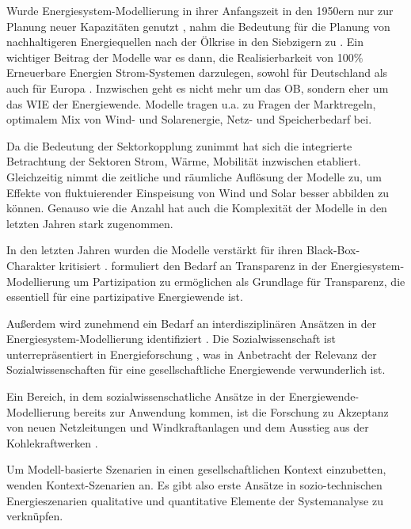 \documentclass[a4paper,11pt,twoside]{scrartcl}
\begin{document}
Wurde Energiesystem-Modellierung in ihrer Anfangszeit in den 1950ern nur zur Planung neuer Kapazitäten genutzt \cite{Kagiannas2004}, nahm die Bedeutung für die Planung von nachhaltigeren Energiequellen nach der Ölkrise in den Siebzigern zu \cite{Wei2006}. Ein wichtiger Beitrag der Modelle war es dann, die Realisierbarkeit von 100\% Erneuerbare Energien Strom-Systemen darzulegen, sowohl für Deutschland \cite{SRU2011} als auch für Europa \cite{Hohmeyer2015}. Inzwischen geht es nicht mehr um das OB, sondern eher um das WIE der Energiewende. Modelle tragen u.a. zu Fragen der Marktregeln, optimalem Mix von Wind- und Solarenergie, Netz- und Speicherbedarf bei.  

Da die Bedeutung der Sektorkopplung zunimmt \cite{Quaschning2016} hat sich die integrierte Betrachtung der Sektoren Strom, Wärme, Mobilität inzwischen etabliert. Gleichzeitig nimmt die zeitliche und räumliche Auflösung der Modelle zu, um Effekte von fluktuierender Einspeisung von Wind und Solar besser abbilden zu können. Genauso wie die Anzahl hat auch die Komplexität der Modelle in den letzten Jahren stark zugenommen.

In den letzten Jahren wurden die Modelle verstärkt für ihren Black-Box-Charakter kritisiert \cite{Pfenninger2017, Pfenninger2017b,Cao2016}. \cite{Wiese2015} formuliert den Bedarf an Transparenz in der Energiesystem-Modellierung um Partizipation zu ermöglichen \cite{Wiese2014} als Grundlage für Transparenz, die essentiell für eine partizipative Energiewende ist.

Außerdem wird zunehmend ein Bedarf an interdisziplinären Ansätzen in der Energiesystem-Modellierung identifiziert \cite{Wiese2018,Pfenninger2014,Schuitema2017}. Die Sozialwissenschaft ist unterrepräsentiert in Energieforschung \cite{Sovacool2014}, was in Anbetracht der Relevanz der Sozialwissenschaften für eine gesellschaftliche Energiewende \cite{Sovacool2015} verwunderlich ist.

Ein Bereich, in dem sozialwissenschatliche Ansätze in der Energiewende-Modellierung bereits zur Anwendung kommen, ist die Forschung zu Akzeptanz von neuen Netzleitungen und Windkraftanlagen \cite{vernetzen2016} und dem Ausstieg aus der Kohlekraftwerken \cite{Heinrichs2017}.

Um Modell-basierte Szenarien in einen gesellschaftlichen Kontext einzubetten, wenden \cite{WEIMERJEHLE2016} Kontext-Szenarien \cite{WEIMERJEHLE2006} an. Es gibt also erste Ansätze in  sozio-technischen Energieszenarien qualitative und quantitative Elemente der Systemanalyse zu verknüpfen.
\end{document}
